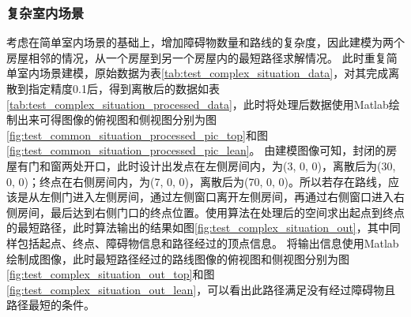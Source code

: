 \subsubsection{复杂室内场景}
\par 考虑在简单室内场景的基础上，增加障碍物数量和路线的复杂度，因此建模为两个房屋相邻的情况，从一个房屋到另一个房屋内的最短路径求解情况。
此时重复简单室内场景建模，原始数据为表\ref{tab:test_complex_situation_data}，对其完成离散到指定精度0.1后，得到离散后的数据如表\ref{tab:test_complex_situation_processed_data}，此时将处理后数据使用Matlab绘制出来可得图像的俯视图和侧视图分别为图\ref{fig:test_common_situation_processed_pic_top}和图\ref{fig:test_common_situation_processed_pic_lean}。
由建模图像可知，封闭的房屋有门和窗两处开口，此时设计出发点在左侧房间内，为(3, 0, 0)，离散后为(30, 0, 0)；终点在右侧房间内，为(7, 0, 0)，离散后为(70, 0, 0)。所以若存在路线，应该是从左侧门进入左侧房间，通过左侧窗口离开左侧房间，再通过右侧窗口进入右侧房间，最后达到右侧门口的终点位置。使用算法在处理后的空间求出起点到终点的最短路径，此时算法输出的结果如图\ref{fig:test_complex_situation_out}，其中同样包括起点、终点、障碍物信息和路径经过的顶点信息。
将输出信息使用Matlab绘制成图像，此时最短路径经过的路线图像的俯视图和侧视图分别为图\ref{fig:test_complex_situation_out_top}和图\ref{fig:test_complex_situation_out_lean}，可以看出此路径满足没有经过障碍物且路径最短的条件。
